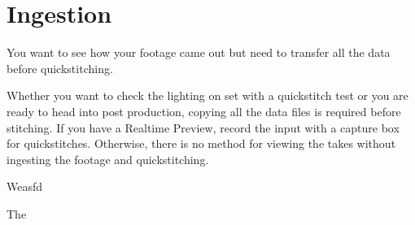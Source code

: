 \chapter{Ingestion}
\pagecolor{white}
\label{chap:??}
\begin{fullwidth}

\problem

{\large You want to see how your footage came out but need to transfer all the data before quickstitching.

 \par}

Whether you want to check the lighting on set with a quickstitch test or you are ready to head into post production, copying all the data files is required before stitching. If you have a Realtime Preview, record the input with a capture box for quickstitches. Otherwise, there is no method for viewing the takes without ingesting the footage and quickstitching. 

\solution

{\large Weasfd


 \par}

The 




\clearpage
\end{fullwidth}
